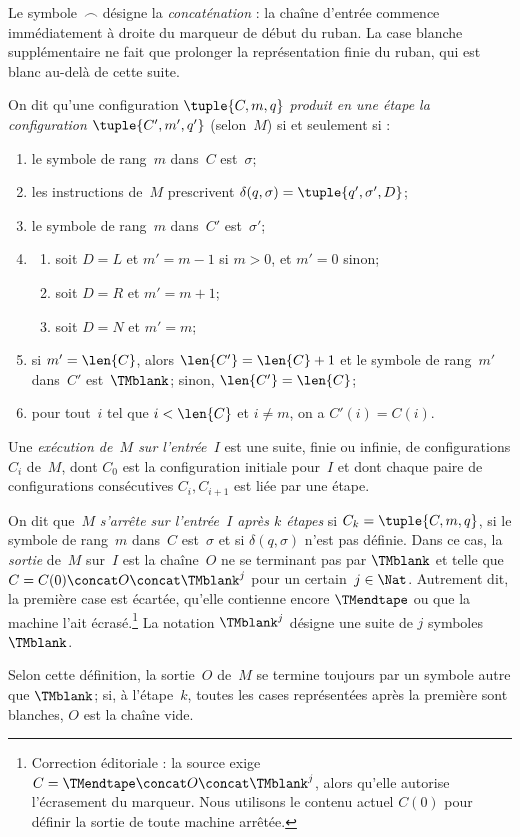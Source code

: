 \documentclass[../../../include/open-logic-section]{subfiles}
\begin{document}
\begin{explain}
Le symbole~$\frown$ désigne la \emph{concaténation} :
la chaîne d'entrée commence immédiatement à droite
du marqueur de début du ruban. La case blanche
supplémentaire ne fait que prolonger la représentation
finie du ruban, qui est blanc au-delà de cette suite.
\end{explain}

\begin{defn}
On dit qu'une configuration $\tuple{C,m,q}$
\emph{produit en une étape la configuration
$\tuple{C',m',q'}$} (selon~$M$) si et seulement si :
\begin{enumerate}
\item le symbole de rang~$m$ dans~$C$ est~$\sigma$;
\item les instructions de~$M$ prescrivent
  $\delta(q,\sigma)=\tuple{q',\sigma',D}$;
\item le symbole de rang~$m$ dans~$C'$ est~$\sigma'$;
\item
\begin{enumerate}
\item soit $D=L$ et $m'=m-1$ si $m>0$,
  et $m'=0$ sinon;
\item soit $D=R$ et $m'=m+1$;
\item soit $D=N$ et $m'=m$;
\end{enumerate}
\item si $m'=\len{C}$, alors
  $\len{C'}=\len{C}+1$ et le symbole de rang~$m'$
  dans~$C'$ est~$\TMblank$; sinon,
  $\len{C'}=\len{C}$;
\item pour tout~$i$ tel que $i<\len{C}$ et
  $i\neq m$, on a $C'(i)=C(i)$.
\end{enumerate}
\end{defn}

\begin{defn}
Une \emph{exécution de~$M$ sur l'entrée~$I$}
est une suite, finie ou infinie, de configurations
$C_i$ de~$M$, dont $C_0$ est la configuration
initiale pour~$I$ et dont chaque paire de
configurations consécutives $C_i,C_{i+1}$ est
liée par une étape.

On dit que~$M$ \emph{s'arrête sur l'entrée~$I$
après $k$ étapes} si $C_k=\tuple{C,m,q}$,
si le symbole de rang~$m$ dans~$C$ est~$\sigma$
et si $\delta(q,\sigma)$ n'est pas définie.
Dans ce cas, la \emph{sortie} de~$M$ sur~$I$
est la chaîne~$O$ ne se terminant pas par
$\TMblank$ et telle que
$C=C(0)\concat O\concat\TMblank^j$ pour un
certain~$j\in\Nat$. Autrement dit, la première
case est écartée, qu'elle contienne encore
$\TMendtape$ ou que la machine l'ait écrasé.\footnote{Correction éditoriale : la source exige $C=\TMendtape\concat O\concat\TMblank^j$, alors qu'elle autorise l'écrasement du marqueur. Nous utilisons le contenu actuel $C(0)$ pour définir la sortie de toute machine arrêtée.}
La notation $\TMblank^j$ désigne une suite de
$j$ symboles $\TMblank$.
\end{defn}

\begin{explain}
Selon cette définition, la sortie~$O$ de~$M$
se termine toujours par un symbole autre que
$\TMblank$; si, à l'étape~$k$, toutes les cases
représentées après la première sont blanches,
$O$ est la chaîne vide.
\end{explain}
\end{document}
